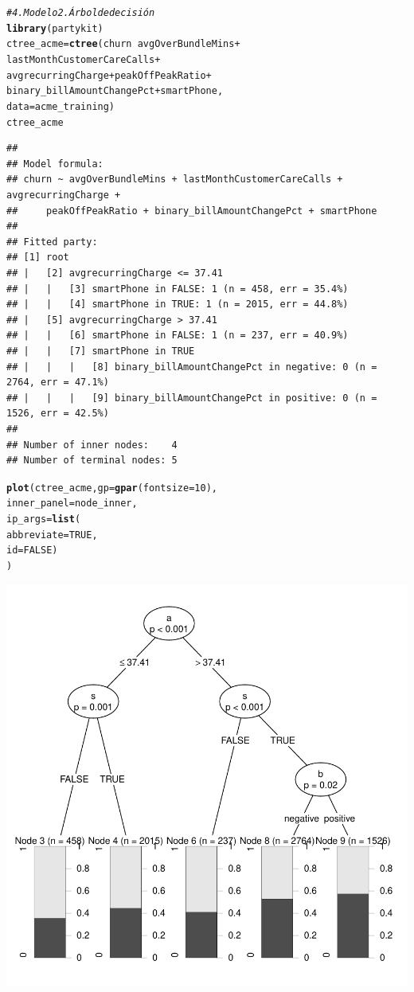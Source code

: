 \documentclass{article}\usepackage[]{graphicx}\usepackage[]{xcolor}
\makeatletter
\newcommand{\hlnum}[1]{\textcolor[rgb]{0.686,0.059,0.569}{#1}}%
\newcommand{\hlcom}[1]{\textcolor[rgb]{0.678,0.584,0.686}{\textit{#1}}}%
\newcommand{\hlopt}[1]{\textcolor[rgb]{0,0,0}{#1}}%
\newcommand{\hlstd}[1]{\textcolor[rgb]{0.345,0.345,0.345}{#1}}%
\newcommand{\hlkwb}[1]{\textcolor[rgb]{0.69,0.353,0.396}{#1}}%
\newcommand{\hlkwc}[1]{\textcolor[rgb]{0.333,0.667,0.333}{#1}}%
\newcommand{\hlkwd}[1]{\textcolor[rgb]{0.737,0.353,0.396}{\textbf{#1}}}%
\newenvironment{kframe}{%
 \def\at@end@of@kframe{}%
 \ifinner\ifhmode%
  \def\at@end@of@kframe{\end{minipage}}%
  \begin{minipage}{\columnwidth}%
 \fi\fi%
 \def\FrameCommand##1{\hskip\@totalleftmargin \hskip-\fboxsep
 \colorbox{shadecolor}{##1}\hskip-\fboxsep
     \hskip-\linewidth \hskip-\@totalleftmargin \hskip\columnwidth}%
 \MakeFramed {\advance\hsize-\width
   \@totalleftmargin\z@ \linewidth\hsize
   \@setminipage}}%
 {\par\unskip\endMakeFramed%
 \at@end@of@kframe}
\newenvironment{knitrout}{}{} %
\makeatother
\begin{document}
\begin{knitrout}
{}


\begin{kframe}\begin{alltt}
\hlcom{# 4. Modelo 2. Árbol de decisión}
\hlkwd{library}\hlstd{(partykit)}
\hlstd{ctree_acme} \hlkwb{=} \hlkwd{ctree}\hlstd{(churn} \hlopt{~} \hlstd{avgOverBundleMins} \hlopt{+}
                     \hlstd{lastMonthCustomerCareCalls} \hlopt{+}
                     \hlstd{avgrecurringCharge} \hlopt{+} \hlstd{peakOffPeakRatio} \hlopt{+}
                     \hlstd{binary_billAmountChangePct} \hlopt{+} \hlstd{smartPhone,}
                   \hlkwc{data}\hlstd{=acme_training)}
\hlstd{ctree_acme}
\end{alltt}
\begin{verbatim}
## 
## Model formula:
## churn ~ avgOverBundleMins + lastMonthCustomerCareCalls + avgrecurringCharge + 
##     peakOffPeakRatio + binary_billAmountChangePct + smartPhone
## 
## Fitted party:
## [1] root
## |   [2] avgrecurringCharge <= 37.41
## |   |   [3] smartPhone in FALSE: 1 (n = 458, err = 35.4%)
## |   |   [4] smartPhone in TRUE: 1 (n = 2015, err = 44.8%)
## |   [5] avgrecurringCharge > 37.41
## |   |   [6] smartPhone in FALSE: 1 (n = 237, err = 40.9%)
## |   |   [7] smartPhone in TRUE
## |   |   |   [8] binary_billAmountChangePct in negative: 0 (n = 2764, err = 47.1%)
## |   |   |   [9] binary_billAmountChangePct in positive: 0 (n = 1526, err = 42.5%)
## 
## Number of inner nodes:    4
## Number of terminal nodes: 5
\end{verbatim}
\begin{alltt}
\hlkwd{plot}\hlstd{(ctree_acme,} \hlkwc{gp} \hlstd{=} \hlkwd{gpar}\hlstd{(}\hlkwc{fontsize} \hlstd{=} \hlnum{10}\hlstd{),}
     \hlkwc{inner_panel}\hlstd{=node_inner,}
     \hlkwc{ip_args}\hlstd{=}\hlkwd{list}\hlstd{(}
       \hlkwc{abbreviate} \hlstd{=} \hlnum{TRUE}\hlstd{,}
       \hlkwc{id} \hlstd{=} \hlnum{FALSE}\hlstd{)}
\hlstd{)}
\end{alltt}
\end{kframe}

{\centering \includegraphics[width=.6\linewidth]{figure/RF1-SOLUCION-Rnwauto-report-2} 

}
\end{knitrout}
\end{document}
